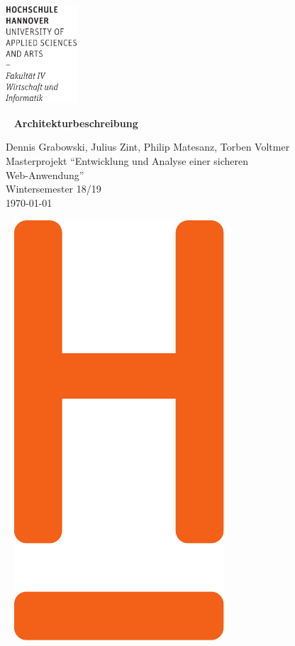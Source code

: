 \documentclass[12pt,DIV14,BCOR10mm,a4paper,parskip=half-,headsepline,headinclude,english,ngerman,bibliography=totocnumbered]{scrreprt}
\begin{document}
  \thispagestyle{empty} %
\includegraphics[width=0.2\textwidth]{Wortmarke_WI_schwarz}

   {  ~ \sffamily
  \vfill
  {\Huge\bfseries Architekturbeschreibung}
  \bigskip

  {\Large
  Dennis Grabowski, Julius Zint, Philip Matesanz, Torben Voltmer \\[2ex]
  Masterprojekt \enquote{Entwicklung und Analyse einer sicheren \\Web-Anwendung} \\
  Wintersemester 18/19
 \\[5ex]
   \today }
}
 \vfill

  ~ \hfill
  \includegraphics[height=0.3\paperheight]{H_WI_Pantone1665}
\end{document}
